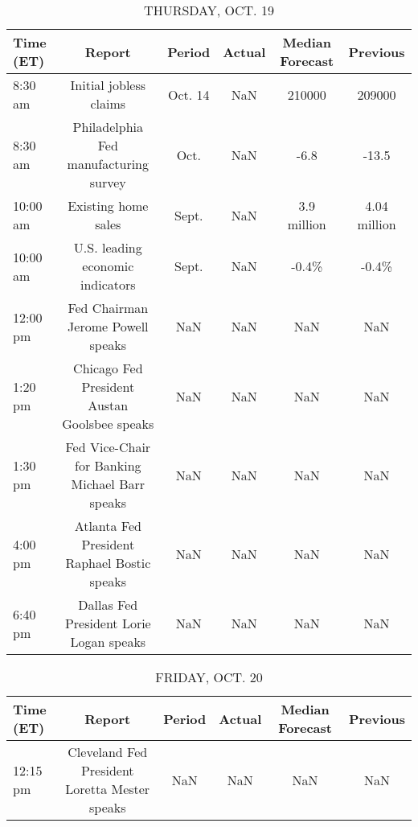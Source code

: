 \documentclass{article}%
\begin{document}
\begin{table}[htbp]%
\caption{THURSDAY, OCT. 19}%
\centering%
\begin{adjustbox}{width=1\textwidth}%
\begin{tabular}{lccccc}
\toprule
Time (ET) &                                         Report &  Period & Actual & Median Forecast &     Previous \\
\midrule
  8:30 am &                         Initial jobless claims & Oct. 14 &    NaN &          210000 &       209000 \\
  8:30 am &          Philadelphia Fed manufacturing survey &    Oct. &    NaN &            -6.8 &        -13.5 \\
 10:00 am &                            Existing home sales &   Sept. &    NaN &     3.9 million & 4.04 million \\
 10:00 am &               U.S. leading economic indicators &   Sept. &    NaN &           -0.4\% &        -0.4\% \\
 12:00 pm &              Fed Chairman Jerome Powell speaks &     NaN &    NaN &             NaN &          NaN \\
  1:20 pm &   Chicago Fed President Austan Goolsbee speaks &     NaN &    NaN &             NaN &          NaN \\
  1:30 pm & Fed Vice-Chair for Banking Michael Barr speaks &     NaN &    NaN &             NaN &          NaN \\
  4:00 pm &    Atlanta Fed President Raphael Bostic speaks &     NaN &    NaN &             NaN &          NaN \\
  6:40 pm &        Dallas Fed President Lorie Logan speaks &     NaN &    NaN &             NaN &          NaN \\
\bottomrule
\end{tabular}
%
\end{adjustbox}%
\end{table}

%


\begin{table}[htbp]%
\caption{FRIDAY, OCT. 20}%
\centering%
\begin{adjustbox}{width=1\textwidth}%
\begin{tabular}{lccccc}
\toprule
Time (ET) &                                        Report & Period & Actual & Median Forecast & Previous \\
\midrule
 12:15 pm & Cleveland Fed President Loretta Mester speaks &    NaN &    NaN &             NaN &      NaN \\
\bottomrule
\end{tabular}
%
\end{adjustbox}%
\end{table}
\end{document}
